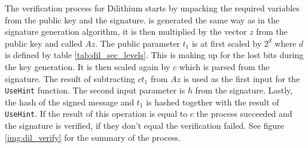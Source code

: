 The verification process for Dilithium starts by unpacking the required variables from the public key and the signature.  is generated the same way as in the signature generation algorithm, it is then multiplied by the vector $z$ from the public key and called $Az$. The public parameter $t_1$ is at first scaled by $2^d$ where $d$ is defined by table \ref{tab:dil_sec_levels}. This is making up for the lost bits during the key generation. It is then scaled again by $c$ which is parsed from the signature. The result of subtracting $ct_1$ from $Az$ is used as the first input for the \texttt{UseHint} function. The second input parameter is $h$ from the signature. Lastly, the hash of the signed message and $t_1$ is hashed together with the result of \texttt{UseHint}. If the result of this operation is equal to $c$ the process succeeded and the signature is verified, if they don't equal the verification failed. See figure \ref{img:dil_verify} for the summary of the process.

